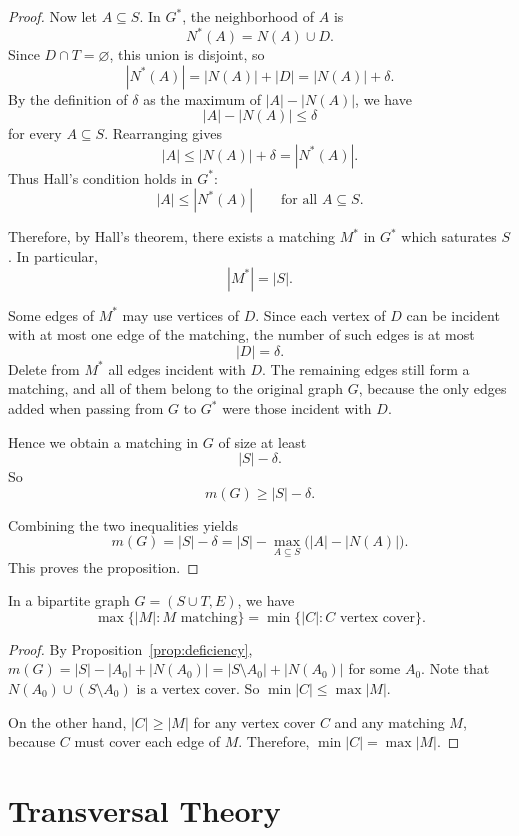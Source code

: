 \documentclass[11pt, a4paper]{ctexrep}
\begin{document}
\begin{proof}
    Now let $A\subseteq S$. In $G^*$, the neighborhood of $A$ is
    \[
        N^*(A)=N(A)\cup D.
    \]
    Since $D\cap T=\varnothing$, this union is disjoint, so
    \[
        |N^*(A)|=|N(A)|+|D|=|N(A)|+\delta.
    \]
    By the definition of $\delta$ as the maximum of $|A|-|N(A)|$, we have
    \[
        |A|-|N(A)|\le \delta
    \]
    for every $A\subseteq S$. Rearranging gives
    \[
        |A|\le |N(A)|+\delta=|N^*(A)|.
    \]
    Thus Hall's condition holds in $G^*$:
    \[
        |A|\le |N^*(A)|\qquad\text{for all }A\subseteq S.
    \]

    Therefore, by Hall's theorem, there exists a matching $M^*$ in $G^*$ which
    saturates $S$. In particular,
    \[
        |M^*|=|S|.
    \]

    Some edges of $M^*$ may use vertices of $D$. Since each vertex of $D$ can be
    incident with at most one edge of the matching, the number of such edges is at
    most
    \[
        |D|=\delta.
    \]
    Delete from $M^*$ all edges incident with $D$. The remaining edges still form a
    matching, and all of them belong to the original graph $G$, because the only
    edges added when passing from $G$ to $G^*$ were those incident with $D$.

    Hence we obtain a matching in $G$ of size at least
    \[
        |S|-\delta.
    \]
    So
    \[
        m(G)\ge |S|-\delta.
    \]

    Combining the two inequalities yields
    \[
        m(G)=|S|-\delta
        =|S|-\max_{A\subseteq S}\bigl(|A|-|N(A)|\bigr).
    \]
    This proves the proposition.
\end{proof}

\begin{theorem}[K\H{o}nig, 1931]\label{thm:konig}
    In a bipartite graph $G=(S\cup T,E)$, we have
    \[
        \max\{|M|:M\text{ matching}\}=\min\{|C|:C\text{ vertex cover}\}.
    \]
\end{theorem}

\begin{proof}
    By Proposition~\ref{prop:deficiency}, $m(G)=|S|-|A_0|+|N(A_0)|=|S\setminus A_0|+|N(A_0)|$ for some $A_0$.
    Note that $N(A_0)\cup (S\setminus A_0)$ is a vertex cover.
    So $\min|C|\leqslant \max|M|$.

    On the other hand, $|C|\geqslant |M|$ for any vertex cover $C$ and any matching $M$, because $C$ must cover each edge of $M$.
    Therefore, $\min|C|=\max|M|$.
\end{proof}

\section{Transversal Theory}
\end{document}
